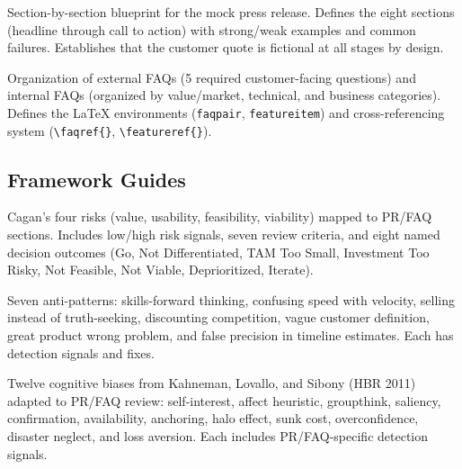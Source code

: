 \documentclass[11pt,letterpaper]{article}
\begin{document}
\begin{description}[style=nextline, leftmargin=2em]
  \item[\texttt{pr-structure.md}]
    Section-by-section blueprint for the mock press release. Defines the eight
    sections (headline through call to action) with strong/weak examples and
    common failures. Establishes that the customer quote is fictional at all
    stages by design.

  \item[\texttt{faq-structure.md}]
    Organization of external FAQs (5 required customer-facing questions) and
    internal FAQs (organized by value/market, technical, and business categories).
    Defines the LaTeX environments (\texttt{faqpair}, \texttt{featureitem}) and
    cross-referencing system (\texttt{\textbackslash faqref\{\}},
    \texttt{\textbackslash featureref\{\}}).
\end{description}

\subsection{Framework Guides}

\begin{description}[style=nextline, leftmargin=2em]
  \item[\texttt{four-risks.md}]
    Cagan's four risks (value, usability, feasibility, viability) mapped to
    PR/FAQ sections. Includes low/high risk signals, seven review criteria, and
    eight named decision outcomes (Go, Not Differentiated, TAM Too Small,
    Investment Too Risky, Not Feasible, Not Viable, Deprioritized, Iterate).

  \item[\texttt{common-mistakes.md}]
    Seven anti-patterns: skills-forward thinking, confusing speed with velocity,
    selling instead of truth-seeking, discounting competition, vague customer
    definition, great product wrong problem, and false precision in timeline
    estimates. Each has detection signals and fixes.

  \item[\texttt{decision-quality.md}]
    Twelve cognitive biases from Kahneman, Lovallo, and Sibony (HBR 2011)
    adapted to PR/FAQ review: self-interest, affect heuristic, groupthink,
    saliency, confirmation, availability, anchoring, halo effect, sunk cost,
    overconfidence, disaster neglect, and loss aversion. Each includes
    PR/FAQ-specific detection signals.
\end{description}
\end{document}
